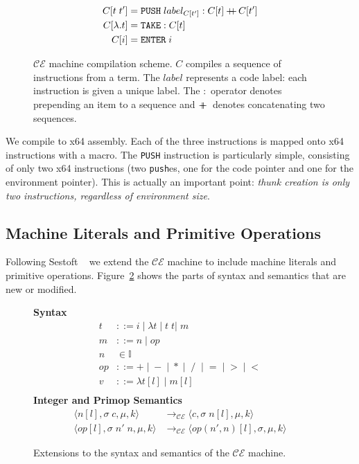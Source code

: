 \begin{figure}
\begin{align*} C[t \; t'] &= \texttt{PUSH}\;label_{C[t']}:C[t] +\!\!\!\!+\, C[t'] \\
C[\lambda.t] &= \texttt{TAKE}:C[t] \\
C[i] &= \texttt{ENTER} \; i
\end{align*}
\caption{$\mathcal{CE}$ machine compilation scheme. $C$ compiles a sequence of
instructions from a term. The $label$ represents a code label: each instruction
is given a unique label. The $:$ operator denotes prepending an item to a
sequence and $+\!\!\!\!+\,$ denotes concatenating two sequences.}
\label{fig:cemcompile}
\end{figure}

We compile to x64 assembly. Each of the three instructions is mapped onto
x64 instructions with a macro. The \texttt{PUSH} instruction is particularly
simple, consisting of only two x64 instructions (two \texttt{push}es, one for
the code pointer and one for the environment pointer). This is actually an
important point: \emph{thunk creation is only two instructions, regardless of
environment size}.  

\subsection{Machine Literals and Primitive Operations}

Following Sestoft ~\cite{sestoft} we extend the $\mathcal{CE}$ machine to
include machine literals and primitive operations. Figure~\ref{fig:extsyntax}
shows the parts of syntax and semantics that are new or modified. 

\begin{figure}
\textbf{Syntax}
\begin{align*}
\tag{Term}    t &::= i \; | \; \lambda t \; | \; t \; t | \; m \\
\tag{Machine} m &::= n \; | \; op \\
\tag{Integer} n &\in \mathbb{I} \\
\tag{PrimOp} op &::= + \; | \; - \; | \; * \; | \; \; / \;\; | \; = \; | \; > \; | \; < \\
\tag{Value} v &::= \lambda t[l] \; | \; m[l] \\
\end{align*}
\textbf{Integer and Primop Semantics}
\begin{align*}
\tag{Int}
\langle n[l], \sigma \; c, \mu, k \rangle
  &\rightarrow_{\mathcal{CE}}
\langle c, \sigma \; n[l], \mu, k \rangle \\
\tag{Op} 
\langle op[l], \sigma \; n' \; n, \mu, k \rangle
  &\rightarrow_{\mathcal{CE}}
\langle op(n',n)[l], \sigma, \mu, k \rangle
\end{align*}
\caption{Extensions to the syntax and semantics of the $\mathcal{CE}$ machine.}
\label{fig:extsyntax}
\end{figure}

